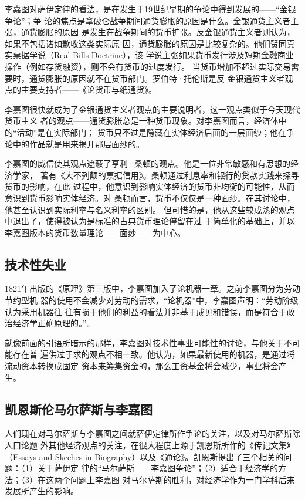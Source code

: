 李嘉图对萨伊定律的看法，是在发生于19世纪早期的争论中得到发展的——“金银争论”；争
论的焦点是拿破仑战争期间通货膨胀的原因是什么。金银通货主义者主张，通货膨胀的原因
是发生在战争期间的货币扩张。反金银通货主义者则认为，如果不包括诸如歉收这类实际原
因，通货膨胀的原因是比较复杂的。他们赞同真实票据学说（Real Bills Doctrine），该
学说主张如果货币发行涉及短期金融商业操作（例如存货融资），则不会有货币的过度发行。
当货币增加不超过实际交易需要时，通货膨胀的原因就不在货币部门。罗伯特·托伦斯是反
金银通货主义者观点的主要支持者——《论货币与纸通货》。

李嘉图很快就成为了金银通货主义者观点的主要说明者，这一观点类似于今天现代货币主义
者的观点——通货膨胀总是一种货币现象。对李嘉图而言，经济体中的“活动”是在实际部门；
货币只不过是隐藏在实体经济后面的一层面纱；他在争论中的作品就是用来揭开那层面纱的。

李嘉图的威信使其观点遮蔽了亨利·桑顿的观点。他是一位非常敏感和有思想的经济学家，
著有《大不列颠的票据信用》。桑顿通过利息率和银行的贷款实践来探寻货币的影响，在此
过程中，他意识到影响实体经济的货币非均衡的可能性，从而意识到货币影响实体经济。对
桑顿而言，货币不仅仅是一种面纱。在其讨论中，他甚至认识到实际利率与名义利率的区别。
但可惜的是，他从这些较成熟的观点中退出了，使得被认为是标准的古典货币理论停留在过
于简单化的基础上，并以李嘉图版本的货币数量理论——面纱——为中心。

\subsection{技术性失业}

1821年出版的《原理》第三版中，李嘉图加入了论机器一章。之前李嘉图分为劳动节约型机
器的使用不会减少对劳动的需求，“论机器”中，李嘉图声明：“劳动阶级认为采用机器往
往有损于他们的利益的看法并非基于成见和错误，而是符合于政治经济学正确原理的。”。

就像前面的引语所暗示的那样，李嘉图对技术性事业可能性的讨论，与他关于不可能存在普
遍供过于求的观点不相一致。他认为，如果最新使用的机器，是通过将流动资本转换成固定
资本来筹集资金的，那么工资基金将会减少，事业将会产生。

\subsection{凯恩斯伦马尔萨斯与李嘉图}

人们现在对马尔萨斯与李嘉图之间就萨伊定律所作争论的关注，以及对马尔萨斯除人口论题
外其他经济观点的关注，在很大程度上源于凯恩斯所作的《传记文集》（Essays and
Skeches in Biography）以及《通论》。凯恩斯提出了三个相关的问题：（1）关于萨伊定
律的“马尔萨斯——李嘉图争论”；（2）适合于经济学的方法；（3）在这两个问题上李嘉图
对马尔萨斯的胜利，对经济学作为一门学科后来发展所产生的影响。


